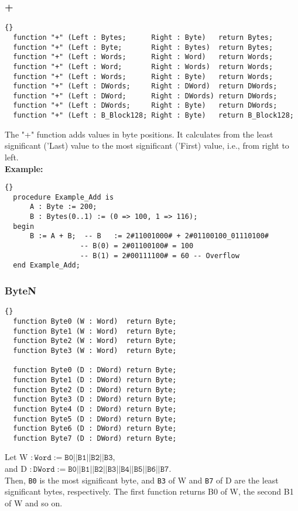 \subsubsection*{+}
\begin{lstlisting}{}
  function "+" (Left : Bytes;      Right : Byte)   return Bytes;
  function "+" (Left : Byte;       Right : Bytes)  return Bytes;
  function "+" (Left : Words;      Right : Word)   return Words;
  function "+" (Left : Word;       Right : Words)  return Words;
  function "+" (Left : Words;      Right : Byte)   return Words;
  function "+" (Left : DWords;     Right : DWord)  return DWords;
  function "+" (Left : DWord;      Right : DWords) return DWords;
  function "+" (Left : DWords;     Right : Byte)   return DWords;
  function "+" (Left : B_Block128; Right : Byte)   return B_Block128;
\end{lstlisting}
The "+" function adds values in byte positions.  It calculates from
the least significant ('Last) value to the most significant ('First)
value, i.e., from right to left.\\ \textbf{Example:}
\begin{lstlisting}{}
  procedure Example_Add is
 	  A : Byte := 200;
 	  B : Bytes(0..1) := (0 => 100, 1 => 116);
  begin
  	  B := A + B;  -- B   := 2#11001000# + 2#01100100_01110100#
                  -- B(0) = 2#01100100# = 100
                  -- B(1) = 2#00111100# = 60 -- Overflow
  end Example_Add;
\end{lstlisting}

\hhline
\subsubsection*{ByteN}
\begin{lstlisting}{}
  function Byte0 (W : Word)  return Byte;
  function Byte1 (W : Word)  return Byte;
  function Byte2 (W : Word)  return Byte;
  function Byte3 (W : Word)  return Byte;

  function Byte0 (D : DWord) return Byte;
  function Byte1 (D : DWord) return Byte;
  function Byte2 (D : DWord) return Byte;
  function Byte3 (D : DWord) return Byte;
  function Byte4 (D : DWord) return Byte;
  function Byte5 (D : DWord) return Byte;
  function Byte6 (D : DWord) return Byte;
  function Byte7 (D : DWord) return Byte;
\end{lstlisting}
Let W $\mathtt{: Word  := B0||B1||B2||B3}$,\\
and D $\mathtt{: DWord := B0||B1||B2||B3||B4||B5||B6||B7}$.\\
Then, \texttt{B0} is the most significant byte, and \texttt{B3} of W
and \texttt{B7} of D are the least significant bytes, respectively.
The first function returns B0 of W, the second B1 of W and so on.

